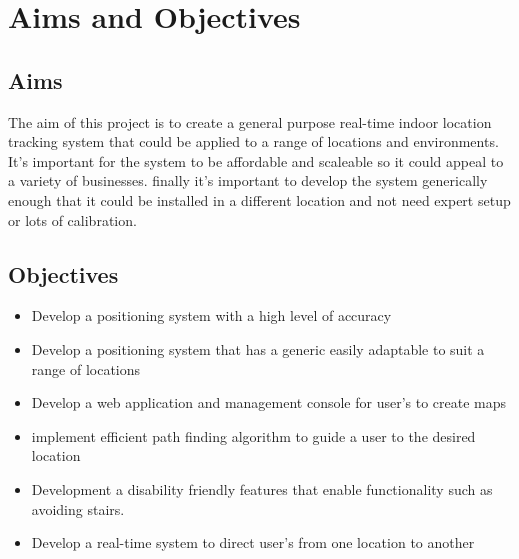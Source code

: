 \section{Aims and Objectives}\label{aimssandobj}
\subsection{Aims}
The aim of this project is to create a general purpose real-time indoor location tracking system that could be applied to a range of locations and environments. It's important for the system  to be affordable and scaleable so it could appeal to a variety of businesses. finally it's important to develop the system generically enough that it could be installed in a different location and not need expert setup or lots of calibration.

\subsection{Objectives}
\begin{itemize}
	\item Develop a positioning system with a high level of accuracy
	\item Develop a positioning system that has a generic easily adaptable to suit a range of locations
	\item Develop a web application and management console for user’s to create maps
	\item implement efficient path finding algorithm to guide a user to the desired location
	\item Development a disability friendly features that enable functionality such as avoiding stairs.
	\item Develop a real-time system to direct user's from one location to another
\end{itemize}
\newpage
